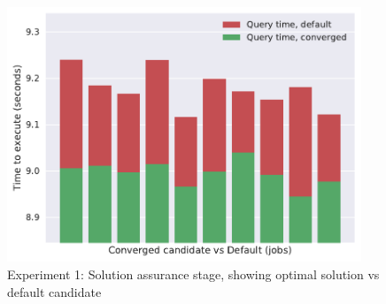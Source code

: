 \documentclass[a4paper,english]{report}
\begin{document}
	\begin{figure}[H]
		\centering
		\includegraphics[width=300pt]{runlogs/final5/4}
		\caption{Experiment 1: Solution assurance stage, showing optimal solution vs default candidate}
		\label{fig:final14}
	\end{figure}
	\clearpage
\end{document}
